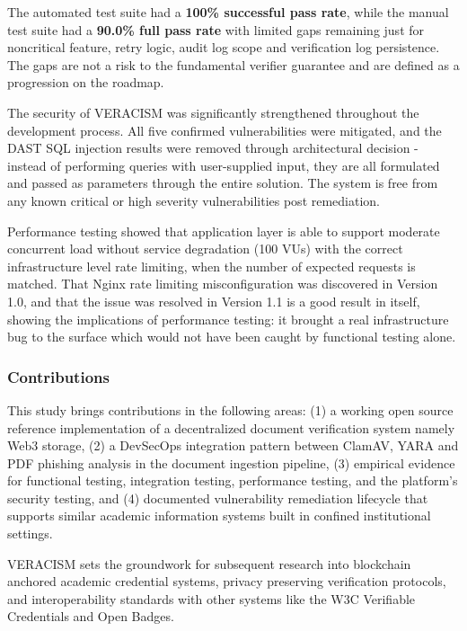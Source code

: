 The automated test suite had a \textbf{100\% successful pass rate}, while the manual test suite
had a \textbf{90.0\% full pass rate} with limited gaps remaining just for noncritical feature, retry logic, audit log scope and verification log persistence. The gaps are not a risk to the fundamental verifier guarantee and are defined as a progression on the roadmap.

The security of VERACISM was significantly strengthened throughout the development process. All five confirmed vulnerabilities were mitigated, and the DAST SQL injection results were removed through architectural decision - instead of performing queries with user-supplied input, they are all formulated and passed as parameters through the entire solution. The system is free from any known critical or high severity vulnerabilities post remediation.

Performance testing showed that application layer is able to support moderate concurrent load without service degradation (100 VUs) with the correct infrastructure level rate limiting, when the number of expected requests is matched. That Nginx rate limiting misconfiguration was discovered in Version 1.0, and that the issue was resolved in Version 1.1 is a good result in itself, showing the implications of performance testing: it brought a real infrastructure bug to the surface which would not have been caught by functional testing alone.

\subsubsection{Contributions}

This study brings contributions in the following areas: (1) a working open source reference implementation of a decentralized document verification system namely Web3 storage, (2) a DevSecOps integration pattern between ClamAV, YARA and PDF phishing analysis in the document ingestion pipeline, (3) empirical evidence for functional testing, integration testing, performance testing, and the platform's security testing, and (4) documented vulnerability remediation lifecycle that supports similar academic information systems built in confined institutional settings.

VERACISM sets the groundwork for subsequent research into blockchain anchored academic credential systems, privacy preserving verification protocols, and interoperability standards with other systems like the W3C Verifiable Credentials and Open Badges.
